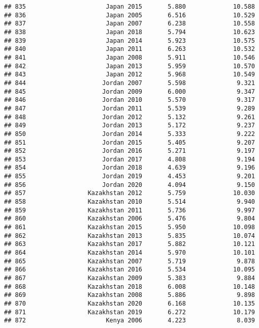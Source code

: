\documentclass[
]{article}
\begin{document}
\begin{verbatim}
## 835                      Japan 2015       5.880             10.588
## 836                      Japan 2005       6.516             10.529
## 837                      Japan 2007       6.238             10.558
## 838                      Japan 2018       5.794             10.623
## 839                      Japan 2014       5.923             10.575
## 840                      Japan 2011       6.263             10.532
## 841                      Japan 2008       5.911             10.546
## 842                      Japan 2013       5.959             10.570
## 843                      Japan 2012       5.968             10.549
## 844                     Jordan 2007       5.598              9.321
## 845                     Jordan 2009       6.000              9.347
## 846                     Jordan 2010       5.570              9.317
## 847                     Jordan 2011       5.539              9.289
## 848                     Jordan 2012       5.132              9.261
## 849                     Jordan 2013       5.172              9.237
## 850                     Jordan 2014       5.333              9.222
## 851                     Jordan 2015       5.405              9.207
## 852                     Jordan 2016       5.271              9.197
## 853                     Jordan 2017       4.808              9.194
## 854                     Jordan 2018       4.639              9.196
## 855                     Jordan 2019       4.453              9.201
## 856                     Jordan 2020       4.094              9.150
## 857                 Kazakhstan 2012       5.759             10.030
## 858                 Kazakhstan 2010       5.514              9.940
## 859                 Kazakhstan 2011       5.736              9.997
## 860                 Kazakhstan 2006       5.476              9.804
## 861                 Kazakhstan 2015       5.950             10.098
## 862                 Kazakhstan 2013       5.835             10.074
## 863                 Kazakhstan 2017       5.882             10.121
## 864                 Kazakhstan 2014       5.970             10.101
## 865                 Kazakhstan 2007       5.719              9.878
## 866                 Kazakhstan 2016       5.534             10.095
## 867                 Kazakhstan 2009       5.383              9.884
## 868                 Kazakhstan 2018       6.008             10.148
## 869                 Kazakhstan 2008       5.886              9.898
## 870                 Kazakhstan 2020       6.168             10.135
## 871                 Kazakhstan 2019       6.272             10.179
## 872                      Kenya 2006       4.223              8.039

\end{verbatim}
\end{document}
